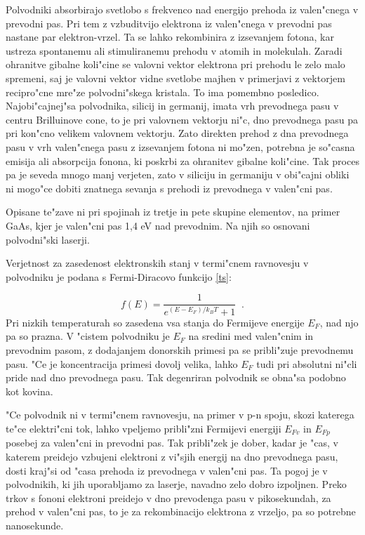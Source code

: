 Polvodniki absorbirajo svetlobo s frekvenco nad energijo prehoda iz
valen"cnega v prevodni pas. Pri tem z vzbuditvijo elektrona iz valen"cnega v
prevodni pas nastane par elektron-vrzel. Ta se lahko rekombinira z
izsevanjem fotona, kar ustreza spontanemu ali stimuliranemu prehodu v atomih
in molekulah. Zaradi ohranitve gibalne koli"cine se valovni vektor elektrona
pri prehodu le zelo malo spremeni, saj je valovni vektor vidne svetlobe
majhen v primerjavi z vektorjem recipro"cne mre"ze polvodni"skega kristala.
To ima pomembno posledico. Najobi"cajnej"sa polvodnika, silicij in germanij,
imata vrh prevodnega pasu v centru Brilluinove cone, to je pri valovnem
vektorju ni"c, dno prevodnega pasu pa pri kon"cno velikem valovnem vektorju.
Zato direkten prehod z dna prevodnega pasu v vrh valen"cnega pasu z
izsevanjem fotona ni mo"zen, potrebna je so"casna emisija ali absorpcija
fonona, ki poskrbi za ohranitev gibalne koli"cine. Tak proces pa je seveda
mnogo manj verjeten, zato v siliciju in germaniju v obi"cajni obliki ni
mogo"ce dobiti znatnega sevanja s prehodi iz prevodnega v valen"cni pas.

Opisane te"zave ni pri spojinah iz tretje in pete skupine elementov, na
primer GaAs, kjer je valen"cni pas 1,4 eV nad prevodnim. Na njih so osnovani
polvodni"ski laserji.

Verjetnost za zasedenost elektronskih stanj v termi"cnem ravnovesju v
polvodniku je podana s Fermi-Diracovo funkcijo \ref{ts}:

\begin{equation}  \label{6.1}
f(E)=\frac{1}{e^{(E-E_F)/k_B T}+1}\;\;.
\end{equation}
Pri nizkih temperaturah so zasedena vsa stanja do Fermijeve energije $E_F$,
nad njo pa so prazna. V "cistem polvodniku je $E_F$ na sredini med
valen"cnim in prevodnim pasom, z dodajanjem donorskih primesi pa se
pribli"zuje prevodnemu pasu. "Ce je koncentracija primesi dovolj velika,
lahko $E_F$ tudi pri absolutni ni"cli pride nad dno prevodnega pasu. Tak
degenriran polvodnik se obna"sa podobno kot kovina.

"Ce polvodnik ni v termi"cnem ravnovesju, na primer v p-n spoju, skozi
katerega te"ce elektri"cni tok, lahko vpeljemo pribli"zni Fermijevi energiji 
$E_{Fv}$ in $E_{Fp}$ posebej za valen"cni in prevodni pas. Tak pribli"zek je
dober, kadar je "cas, v katerem preidejo vzbujeni elektroni z vi"sjih
energij na dno prevodnega pasu, dosti kraj"si od "casa prehoda iz prevodnega
v valen"cni pas. Ta pogoj je v polvodnikih, ki jih uporabljamo za laserje,
navadno zelo dobro izpoljnen. Preko trkov s fononi elektroni preidejo v dno
prevodenga pasu v pikosekundah, za prehod v valen"cni pas, to je za
rekombinacijo elektrona z vrzeljo, pa so potrebne nanosekunde.

